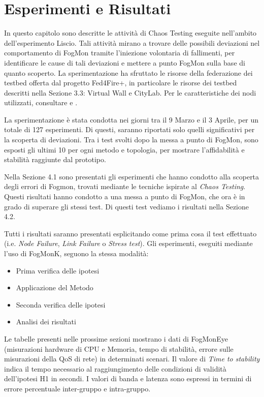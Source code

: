 \chapter{Esperimenti e Risultati}
In questo capitolo sono descritte le attività di Chaos Testing eseguite nell'ambito dell'esperimento Liscio. Tali attività mirano a trovare delle possibili deviazioni nel comportamento di FogMon tramite l'iniezione volontaria di fallimenti, per identificare le cause di tali deviazioni e mettere a punto FogMon sulla base di quanto scoperto. La sperimentazione ha sfruttato le risorse della federazione dei testbed offerta dal progetto Fed4Fire+, in particolare le risorse dei testbed descritti nella Sezione 3.3: Virtual Wall e CityLab. Per le caratteristiche dei nodi utilizzati, consultare \cite{pcgen2} e \cite{clnodes}.

La sperimentazione è stata condotta nei giorni tra il 9 Marzo e il 3 Aprile, per un totale di 127 esperimenti. Di questi, saranno riportati solo quelli significativi per la scoperta di deviazioni. Tra i test svolti dopo la messa a punto di FogMon, sono esposti gli ultimi 10 per ogni metodo e topologia, per mostrare l'affidabilità e stabilità raggiunte dal prototipo.

Nella Sezione 4.1 sono presentati gli esperimenti che hanno condotto alla scoperta degli errori di Fogmon, trovati mediante le tecniche ispirate al \textit{Chaos Testing}. Questi risultati hanno condotto a una messa a punto di FogMon, che ora è in grado di superare gli stessi test. Di questi test vediamo i risultati nella Sezione 4.2.


Tutti i risultati saranno presentati esplicitando come prima cosa il test effettuato (i.e. \textit{Node Failure}, \textit{Link Failure} o \textit{Stress test}). Gli esperimenti, eseguiti mediante l'uso di FogMonK, seguono la stessa modalità:
\begin{itemize}
    \item Prima verifica delle ipotesi
    \item Applicazione del Metodo
    \item Seconda verifica delle ipotesi
    \item Analisi dei risultati
\end{itemize}
Le tabelle presenti nelle prossime sezioni mostrano i dati di FogMonEye (misurazioni hardware di CPU e Memoria, tempo di stabilità, errore sulle misurazioni della QoS di rete) in determinati scenari. Il valore di \textit{Time to stability} indica il tempo necessario al raggiungimento delle condizioni di validità dell'ipotesi H1 in secondi. I valori di banda e latenza sono espressi in termini di errore percentuale inter-gruppo e intra-gruppo.
